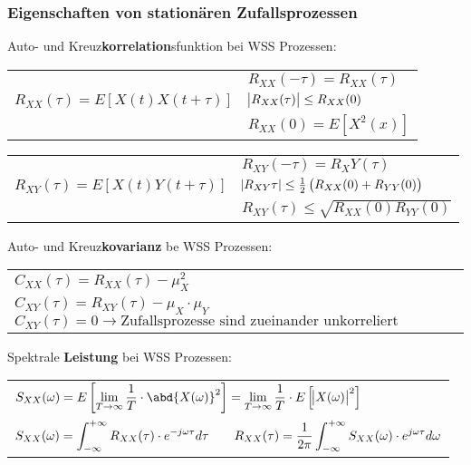 \documentclass[a4paper]{article}
\begin{document}
\begin{twocolumn}
\subsubsection{Eigenschaften von stationären Zufallsprozessen}

Auto- und Kreuz\textbf{korrelation}sfunktion bei WSS Prozessen:
\vspace{0.5em}

\begin{tabularx}{\columnwidth}{ZX}
   & $R_{XX}(-\tau) = R_{XX}(\tau)$ \\
   $R_{XX}(\tau) = E\left[ X(t) X(t + \tau) \right]$ &
   $\abs{R_{XX}(\tau)} \leq R_{XX}(0)$ \\
   & $R_{XX}(0) = E\left[ X^2(x) \right]$ \\
\end{tabularx}

\vspace{0.5em}

\begin{tabularx}{\columnwidth}{ZX}   
   & $R_{XY}(-\tau) = R_XY(\tau)$ \\
   $R_{XY}(\tau) = E\left[ X(t) Y(t + \tau) \right]$ &
   $\abs{R_{XY}{\tau}} \leq \frac{1}{2} \left( R_{XX}(0) + R_{YY}(0) \right)$ \\
   & $R_{XY}(\tau) \leq \sqrt{R_{XX}(0) R_{YY}(0)}$ \\
\end{tabularx}

\vspace{1em}
Auto- und Kreuz\textbf{kovarianz} be WSS Prozessen:
\vspace{0.5em}

\begin{tabularx}{\columnwidth}{Y}
  $C_{XX}(\tau) = R_{XX}(\tau) - \mu_X^2$ \\
  $C_{XY}(\tau) = R_{XY}(\tau) - \mu_X \cdot \mu_Y$
  $C_{XY}(\tau) = 0 \longrightarrow \text{Zufallsprozesse sind zueinander unkorreliert}$
\end{tabularx}

\vspace{1em}
Spektrale \textbf{Leistung} bei WSS Prozessen:
\vspace{0.5em}

\begin{tabularx}{\columnwidth}{Y}
  $\fmm S_{XX}(\omega) = E \left[ \lim_{T\rightarrow \infty} \frac{1}{T} \cdot
  \abd{X(\omega)}^2 \right] = \lim_{T\rightarrow \infty} \frac{1}{T} \cdot E\left[
  \abs{X(\omega)}^2 \right]$ \\
  $\displaystyle S_{XX}(\omega) = \int_{-\infty}^{+\infty} R_{XX}(\tau) \cdot e^{-j \omega \tau}d \tau \qquad
  R_{XX}(\tau) = \frac{1}{2\pi} \int_{-\infty}^{+\infty} S_{XX}(\omega) \cdot e^{j \omega \tau} d\omega$
\end{tabularx}


\end{twocolumn}
\end{document}

